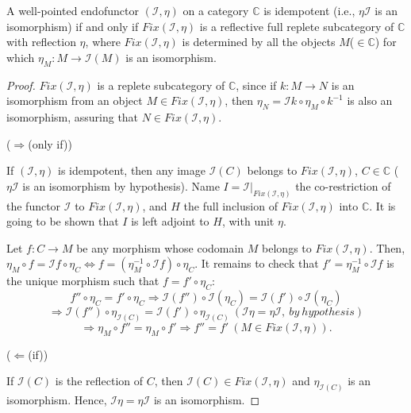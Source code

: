 \documentclass[10pt,a4paper]{amsart}
\begin{document}
\begin{proposition}\label{proposition:idempotent endofunctor}

A well-pointed endofunctor $(\mathcal{I},\eta)$ on a category $\mathbb{C}$ is idempotent (i.e., $\eta\mathcal{I}$ is an isomorphism) if and only if $Fix(\mathcal{I},\eta)$ is a reflective full replete subcategory of $\mathbb{C}$ with reflection $\eta$, where $Fix(\mathcal{I},\eta)$ is determined by all the objects $M$($\in\mathbb{C}$) for which $\eta_M:M\rightarrow \mathcal{I}(M)$ is an isomorphism.

\end{proposition}

\begin{proof}
$Fix(\mathcal{I},\eta)$ is a replete subcategory of $\mathbb{C}$, since if $k:M\rightarrow N$ is an isomorphism from an object $M\in Fix(\mathcal{I},\eta)$, then $\eta_N=\mathcal{I}k\circ\eta_M\circ k^{-1}$ is also an isomorphism, assuring that $N\in Fix(\mathcal{I},\eta)$.

\noindent ($\Rightarrow$(only if))

If $(\mathcal{I},\eta)$ is idempotent, then any image $\mathcal{I}(C)$ belongs to $Fix(\mathcal{I},\eta)$, $C\in\mathbb{C}$ ($\eta \mathcal{I}$ is an isomorphism by hypothesis). Name $I=\mathcal{I}|_{Fix(\mathcal{I},\eta)}$ the co-restriction of the functor $\mathcal{I}$ to $Fix(\mathcal{I},\eta)$, and $H$ the full inclusion of $Fix(\mathcal{I},\eta)$ into $\mathbb{C}$. It is going to be shown that $I$ is left adjoint to $H$, with unit $\eta$.

Let $f:C\rightarrow M$ be any morphism whose codomain $M$ belongs to $Fix(\mathcal{I},\eta)$. Then, $\eta _M\circ f=\mathcal{I}f\circ \eta_C\Leftrightarrow f=(\eta^{-1}_M\circ \mathcal{I}f)\circ \eta_C$. It remains to check that $f'=\eta^{-1}_M\circ\mathcal{I}f$ is the unique morphism such that $f=f'\circ\eta_C$:
$$f''\circ\eta_C=f'\circ\eta_C\Rightarrow \mathcal{I}(f'')\circ\mathcal{I}(\eta_C)=\mathcal{I}(f')\circ\mathcal{I}(\eta_C)
$$
$$\Rightarrow \mathcal{I}(f'')\circ\eta_{\mathcal{I}(C)}=\mathcal{I}(f')\circ\eta_{\mathcal{I}(C)}\ (\mathcal{I}\eta=\eta\mathcal{I},\ by\ hypothesis)$$
$$\Rightarrow \eta_M\circ f''=\eta_M\circ f'\Rightarrow f''=f'\ (M\in Fix(\mathcal{I},\eta)).$$

\noindent ($\Leftarrow$(if))

If $\mathcal{I}(C)$ is the reflection of $C$, then $\mathcal{I}(C)\in Fix(\mathcal{I},\eta)$ and $\eta_{\mathcal{I}(C)}$ is an isomorphism. Hence, $\mathcal{I}\eta =\eta\mathcal{I}$ is an isomorphism.\end{proof}
\end{document}

